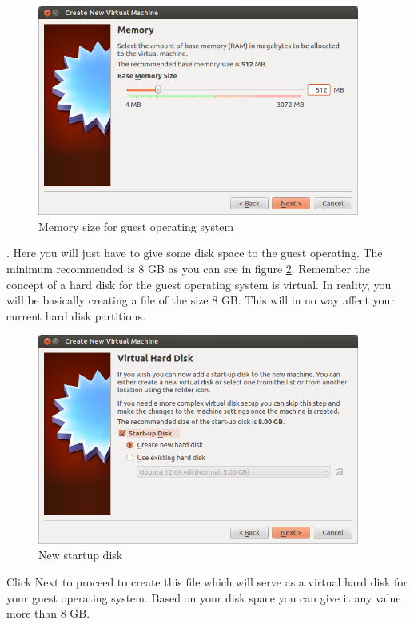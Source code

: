 \begin{figure}[!h]	
	\centering
	\includegraphics[width=300pt]{./images/installation/virtualbox/wizard-memory.png}
	\caption{Memory size for guest operating system}	
	\label{fig:wizard-memory}	
\end{figure}

\par {}. Here you will just have to give some disk space to the guest operating. The minimum recommended is 8 GB as you can see in figure \ref{fig:wizard-newharddisk}.  Remember the concept of a hard disk for the guest operating system is virtual. In reality, you will be basically creating a file of the size 8 GB. This will in no way affect your current hard disk partitions. \\ 

\begin{figure}[!h]	
	\centering
	\includegraphics[width=300pt]{./images/installation/virtualbox/wizard-newharddisk.png}
	\caption{New startup disk}	
	\label{fig:wizard-newharddisk}	
\end{figure}

\par \noindent Click Next to proceed to create this file which will serve as a virtual hard disk for your guest operating system. Based on your disk space you can give it any value more than 8 GB.\\

